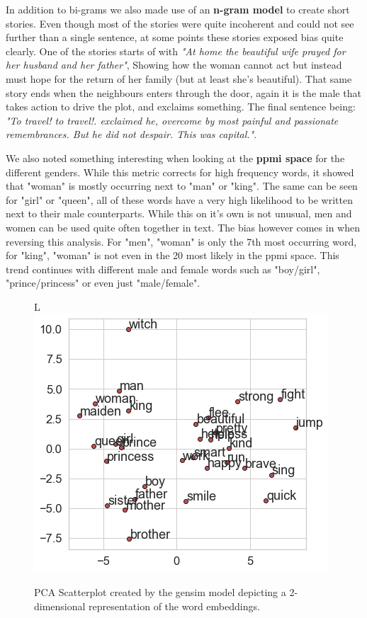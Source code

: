 \documentclass[11pt]{article}
\begin{document}
In addition to bi-grams we also made use of an \textbf{n-gram model} to create short stories. Even though most of the stories were quite incoherent and could not see further than a single sentence, at some points these stories exposed bias quite clearly. One of the stories starts of with {\em"At home the beautiful wife prayed for her husband and her father"}, Showing how the woman cannot act but instead must hope for the return of her family (but at least she's beautiful). That same story ends when the neighbours enters through the door, again it is the male that takes action to drive the plot, and exclaims something. The final sentence being: {\em"To travel! to travel!. exclaimed he,  overcome by most painful and passionate remembrances. But he did not despair. This was capital."}. 


We also noted something interesting when looking at the \textbf{ppmi space} for the different genders. While this metric corrects for high frequency words, it showed that "woman" is mostly occurring next to "man" or "king". The same can be seen for "girl" or "queen", all of these words have a very high likelihood to be written next to their male counterparts. While this on it's own is not unusual, men and women can be used quite often together in text. The bias however comes in when reversing this analysis. For "men", "woman" is only the 7th most occurring word, for "king", "woman" is not even in the 20 most likely in the ppmi space. This trend continues with different male and female words such as "boy/girl", "prince/princess" or even just "male/female".

\begin{figure}{L}
    \centering
    \includegraphics[scale=0.40]{PCA_ScatterPlot.png}
    \caption{\label{fig:PCA} PCA Scatterplot created by the gensim model depicting a 2-dimensional representation of the word embeddings.}
\end{figure}
\end{document}
